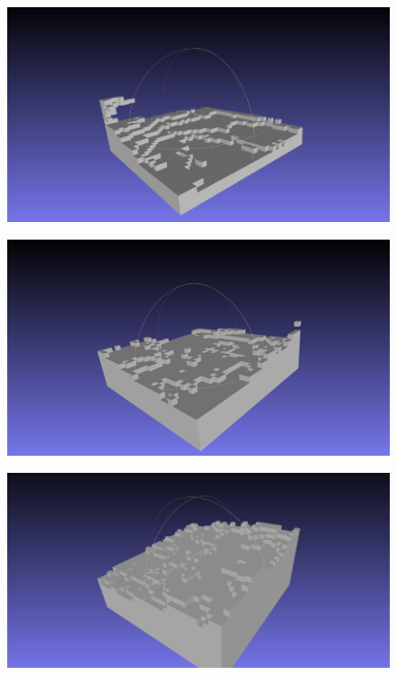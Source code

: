\begin{figure}[htbp]
\begin{minipage}[b]{0.49\linewidth}
      \label{fig:voxel3}
    \end{minipage}
    \begin{minipage}[b]{0.49\linewidth}
      \centering
      \includegraphics[keepaspectratio, scale=0.45]{images/voxel4.png}
      \label{fig:voxel4}
    \end{minipage}
    \begin{minipage}[b]{0.49\linewidth}
        \centering
        \includegraphics[keepaspectratio, scale=0.245]{images/voxel5.png}
        \label{fig:voxel5}
      \end{minipage}
    \begin{minipage}[b]{0.49\linewidth}
    \centering
    \includegraphics[keepaspectratio, scale=0.45]{images/voxel6.png}

\end{minipage}
\end{figure}
